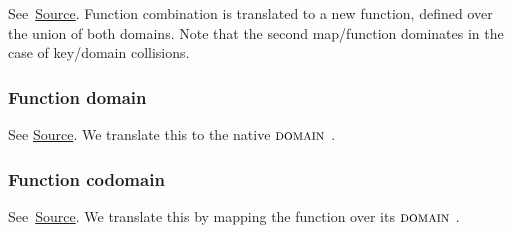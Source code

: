 See~\href{https://github.com/saltiniroberto/ssf/blob/7ea6e18093d9da3154b4e396dd435549f687e6b9/high_level/common/pythonic_code_generic.py#L117-L118}{Source}.
Function combination is translated to a new function, defined over the union of
both domains. Note that the second map/function dominates in the case of
key/domain collisions.


\subsubsection{Function domain}


\begin{mathpar}
\end{mathpar}

See
\href{https://github.com/saltiniroberto/ssf/blob/7ea6e18093d9da3154b4e396dd435549f687e6b9/high_level/common/pythonic_code_generic.py#L121-L122}{Source}.
We translate this to the \tlap{} native $\DOMAIN$.


\subsubsection{ Function codomain}



\begin{mathpar}
\end{mathpar}

See~\href{https://github.com/saltiniroberto/ssf/blob/7ea6e18093d9da3154b4e396dd435549f687e6b9/high_level/common/pythonic_code_generic.py#L125-L126}{Source}.
We translate this by mapping the function over its $\DOMAIN$.
